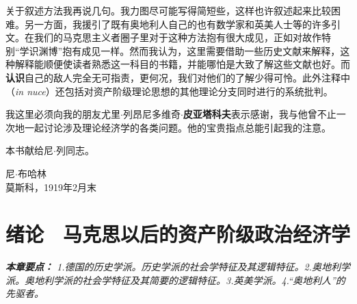 \documentclass[fontset=fandol, a4paper, 12pt, openright]{ctexbook}
\renewenvironment{quote}
  {\list{}{\rightmargin\leftmargin}%
   \item\relax\small\itshape\color{darkgray}}
  {\endlist}
\begin{document}
关于叙述方法我再说几句。我力图尽可能写得简短些，这样也许叙述起来比较困难。另一方面，我援引了既有奥地利人自己的也有数学家和英美人士等的许多引文。在我们的马克思主义者圈子里对于这种方法抱有很大成见，正如对故作特别“学识渊博”抱有成见一样。然而我认为，这里需要借助一些历史文献来解释，这种解释能顺便使读者熟悉这一科目的书籍，并能哪怕是大致了解这些文献也好。而\textbf{认识}自己的敌人完全无可指责，更何况，我们对他们的了解少得可怜。此外注释中（\textit{in nuce}）还包括对资产阶级理论思想的其他理论分支同时进行的系统批判。

我这里必须向我的朋友尤里$\cdot$列昂尼多维奇$\cdot$\textbf{皮亚塔科夫}表示感谢，我与他曾不止一次地一起讨论涉及理论经济学的各类问题。他的宝贵指点总能引起我的注意。

本书献给尼$\cdot$列同志。

\bigskip
\bigskip

\begin{flushright}
    尼$\cdot$布哈林 \\
    莫斯科，1919年2月末
\end{flushright}

\mainmatter


\chapter*{绪论　马克思以后的资产阶级政治经济学}  %

\begin{quote}
\small
\textbf{本章要点：} 1.德国的历史学派。历史学派的社会学特征及其逻辑特征。2.奥地利学派。奥地利学派的社会学特征及其简要的逻辑特征。3.英美学派。4.“奥地利人”的先驱者。
\end{quote}
\end{document}
